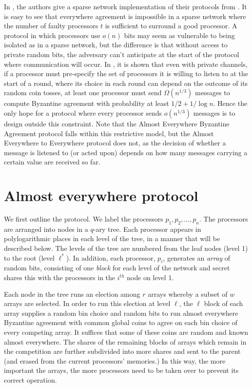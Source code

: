 \documentclass{sig-alternate}
\begin{document}
In \cite{KSSV2}, the authors give a sparse network implementation of their protocols from \cite{KSSV}.   It is easy to see that everywhere agreement is impossible in a sparse network where the number of faulty processors $t$ is sufficient to surround  a good processor.  A protocol in which processors use $o(n)$ bits may seem as vulnerable to being isolated as in a sparse network, but the difference is that without access to private random bits, the adversary can't anticipate at the start of the protocol where communication will occur.   In \cite{HKK}, it is shown that even with private channels, if a processor must pre-specify the set of processors it is willing to listen to at the start of a round,  where its choice in each round can depend on the outcome of its random coin tosses, at least one processor must send $\Omega(n^{1/3})$ messages to compute Byzantine agreement with probability at least $1/2+ 1/\log n$.  Hence the only hope for a protocol where every processor sends $o(n^{1/3})$ messages is to design outside this constraint.  Note that the Almost Everywhere Byzantine Agreement protocol falls within this restrictive model, but the Almost Everywhere to Everywhere protocol does not, as the decision of whether a message is listened to  (or acted upon) depends on how many messages carrying a certain value are received so far. 

\section{Almost everywhere protocol} \label{s:aeprotocol}

We first outline the protocol.  We label the processors $p_{1}, p_{2}, \ldots, p_{n}$.  The processors are arranged into nodes in a $q$-ary tree. Each processor appears in polylogarithmic places in each level of the tree, in a manner that will be described below. The levels of the tree are numbered from the leaf nodes (level 1) to the root (level $\ell^*$).  In addition, each processor, $p_{i}$, generates an \emph{array} of random bits, consisting of one \emph{block} for each level of the network and secret shares this with the processors in the $i^{th}$ node on level 1. 

Each node in the tree runs an election among $r$ arrays whereby a subset of $w$ arrays are selected.  In order to run this election at level $\ell$,
the $\ell$ block of each array supplies a random bin choice and random bits to run almost everywhere Byzantine agreement with common global coins to agree on each bin choice of every competing array.  It suffices that some of these coins are random and known almost everywhere. The  shares of  the remaining blocks of arrays  which remain in the competition are further subdivided into more shares and sent to the parent  (and erased from the current processors'
memories.) In this way, the more important the arrays, the more processors  need to be taken over to prevent its correct operation.
\end{document}
